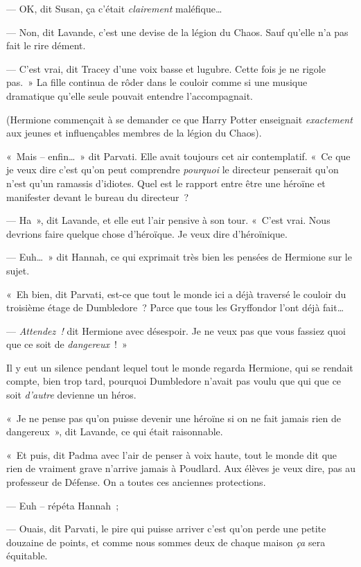 --- OK, dit Susan, ça c'était \emph{clairement} maléfique…

--- Non, dit Lavande, c'est une devise de la légion du Chaos. Sauf qu'elle n'a pas fait le rire dément.

--- C'est vrai, dit Tracey d'une voix basse et lugubre. Cette fois je ne rigole pas.~» La fille continua de rôder dans le couloir comme si une musique dramatique qu'elle seule pouvait entendre l'accompagnait.

(Hermione commençait à se demander ce que Harry Potter enseignait \emph{exactement} aux jeunes et influençables membres de la légion du Chaos).

«~Mais -- enfin…~» dit Parvati. Elle avait toujours cet air contemplatif. «~Ce que je veux dire c'est qu'on peut comprendre \emph{pourquoi} le directeur penserait qu'on n'est qu'un ramassis d'idiotes. Quel est le rapport entre être une héroïne et manifester devant le bureau du directeur~?

--- Ha~», dit Lavande, et elle eut l'air pensive à son tour. «~C'est vrai. Nous devrions faire quelque chose d'héroïque. Je veux dire d'héroïnique.

--- Euh…~» dit Hannah, ce qui exprimait très bien les pensées de Hermione sur le sujet.

«~Eh bien, dit Parvati, est-ce que tout le monde ici a déjà traversé le couloir du troisième étage de Dumbledore~? Parce que tous les Gryffondor l'ont déjà fait…

--- \emph{Attendez~!} dit Hermione avec désespoir. Je ne veux pas que vous fassiez quoi que ce soit de \emph{dangereux}~!~»

Il y eut un silence pendant lequel tout le monde regarda Hermione, qui se rendait compte, bien trop tard, pourquoi Dumbledore n'avait pas voulu que qui que ce soit \emph{d'autre} devienne un héros.

«~Je ne pense pas qu'on puisse devenir une héroïne si on ne fait jamais rien de dangereux~», dit Lavande, ce qui était raisonnable.

«~Et puis, dit Padma avec l'air de penser à voix haute, tout le monde dit que rien de vraiment grave n'arrive jamais à Poudlard. Aux élèves je veux dire, pas au professeur de Défense. On a toutes ces anciennes protections.

--- Euh -- répéta Hannah~;

--- Ouais, dit Parvati, le pire qui puisse arriver c'est qu'on perde une petite douzaine de points, et comme nous sommes deux de chaque maison \emph{ça} sera équitable.

